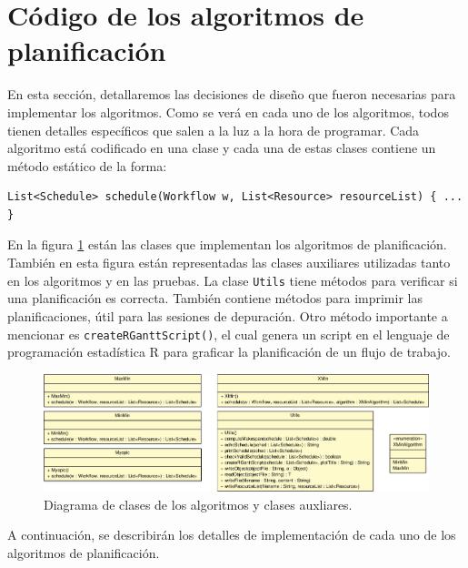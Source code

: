 \section{Código de los algoritmos de planificación}
En esta sección, detallaremos las decisiones de diseño que fueron necesarias para implementar los algoritmos. Como se verá en cada uno de los algoritmos, todos tienen detalles específicos que salen a la luz a la hora de programar. Cada algoritmo está codificado en una clase y cada una de estas clases contiene un método estático de la forma:

\begin{center}
\begin{lstlisting}[numbers=none]
List<Schedule> schedule(Workflow w, List<Resource> resourceList) { ... }
\end{lstlisting}
\end{center}

En la figura \ref{fig:uml_class_scheduler} están las clases que implementan los algoritmos de planificación. También en esta figura están representadas las clases auxiliares utilizadas tanto en los algoritmos y en las pruebas. La clase \texttt{Utils} tiene métodos para verificar si una planificación es correcta. También contiene métodos para imprimir las planificaciones, útil para las sesiones de depuración. Otro método importante a mencionar es \texttt{createRGanttScript()}, el cual genera un script en el lenguaje de programación estadística R \cite{Rlang2014} para graficar la planificación de un flujo de trabajo.

\begin{figure}
\begin{center}
\includegraphics[width=1.2\textwidth, angle=90]{imagenes/scheduler_uml.pdf}
\end{center}
\label{fig:uml_class_scheduler}
\caption{Diagrama de clases de los algoritmos y clases auxliares.}
\end{figure}

A continuación, se describirán los detalles de implementación de cada uno de los algoritmos de planificación.

